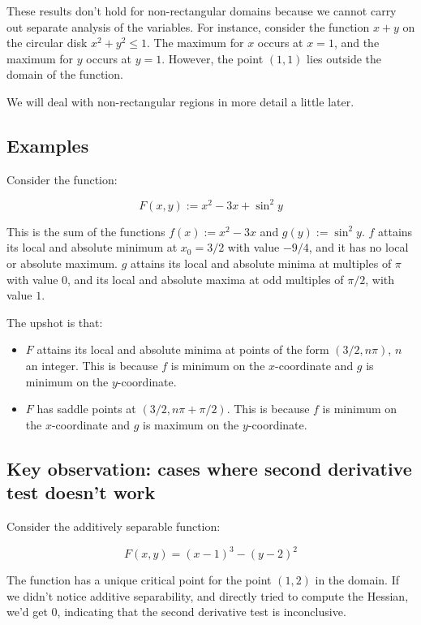 \documentclass[10pt]{amsart}
\begin{document}
These results don't hold for non-rectangular domains because we cannot
carry out separate analysis of the variables. For instance, consider
the function $x + y$ on the circular disk $x^2 + y^2 \le 1$. The
maximum for $x$ occurs at $x = 1$, and the maximum for $y$ occurs at
$y = 1$. However, the point $(1,1)$ lies outside the domain of the
function.

We will deal with non-rectangular regions in more detail a little later.

\subsection{Examples}

Consider the function:

$$F(x,y) := x^2 - 3x + \sin^2y$$

This is the sum of the functions $f(x) := x^2 - 3x$ and $g(y) :=
\sin^2y$. $f$ attains its local and absolute minimum at $x_0 = 3/2$
with value $-9/4$, and it has no local or absolute maximum. $g$
attains its local and absolute minima at multiples of $\pi$ with value
$0$, and its local and absolute maxima at odd multiples of $\pi/2$,
with value $1$.

The upshot is that:

\begin{itemize}
\item $F$ attains its local and absolute minima at points of the form
  $(3/2,n\pi)$, $n$ an integer. This is because $f$ is minimum on the
  $x$-coordinate and $g$ is minimum on the $y$-coordinate.
\item $F$ has saddle points at $(3/2,n\pi + \pi/2)$. This is because
  $f$ is minimum on the $x$-coordinate and $g$ is maximum on the
  $y$-coordinate.
\end{itemize}

\subsection{Key observation: cases where second derivative test doesn't work}

Consider the additively separable function:

$$F(x,y) = (x-1)^3 - (y-2)^2$$

The function has a unique critical point for the point $(1,2)$ in the
domain. If we didn't notice additive separability, and directly tried
to compute the Hessian, we'd get $0$, indicating that the second
derivative test is inconclusive.
\end{document}
